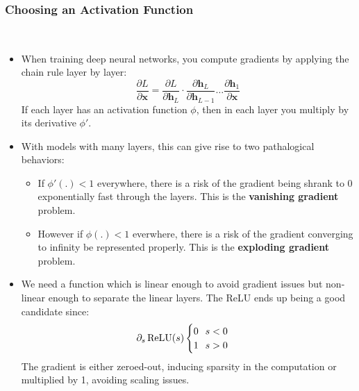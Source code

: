 \documentclass{article}
\newcommand{\tbf}[1]{\textbf{#1}}
\newcommand{\mbf}[1]{\mathbf{#1}}
\begin{document}
    \subsubsection{Choosing an Activation Function}\
    \begin{itemize}
        \item When training deep neural networks, you compute gradients by applying the chain rule layer by layer:
        \[\frac{\partial L}{\partial \mbf{x}} = \frac{\partial L}{\partial \mbf{h}_L} \cdot \frac{\partial \mbf{h}_L}{\partial \mbf{h}_{L-1}} \hdots \frac{\partial \mbf{h}_1}{\partial \mbf{x}}\]
        If each layer has an activation function $\phi$, then in each layer you multiply by its derivative $\phi '$.
        \item With models with many layers, this can give rise to two pathalogical behaviors:
        \begin{itemize}
            \item If $\phi '(.) < 1$ everywhere, there is a risk of the gradient being shrank to 0 exponentially fast through the layers. This is the \tbf{vanishing gradient} problem.
            \item However if $\phi(.) < 1$ everwhere, there is a risk of the gradient converging to infinity be represented properly. This is the \tbf{exploding gradient} problem. 
        \end{itemize}
        \item We need a function which is linear enough to avoid gradient issues but non-linear enough to separate the linear layers. The ReLU ends up being a good candidate since:
        \[\partial_s \operatorname{ReLU}(s)
        \begin{cases}
            0 \hspace{.25cm} s < 0 \\
            1 \hspace{.25cm} s > 0 
        \end{cases}\]
        The gradient is either zeroed-out, inducing sparsity in the computation or multiplied by 1, avoiding scaling issues. 
    \end{itemize}
\end{document}
